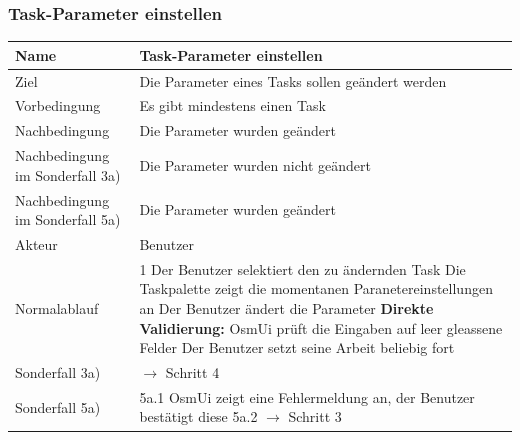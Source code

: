 \documentclass[a4paper,12pt]{scrartcl}
\begin{document}
\subsubsection{Task-Parameter einstellen}
\begin{center}
\begin{tabular}{|p{5cm}|p{10cm}|}
\hline Name & \textbf{Task-Parameter einstellen} \\ 
\hline Ziel & Die Parameter eines Tasks sollen geändert werden\\ 
\hline Vorbedingung & Es gibt mindestens einen Task\\ 
\hline Nachbedingung & Die Parameter wurden geändert\\  
\hline Nachbedingung im Sonderfall 3a) & Die Parameter wurden nicht geändert\\
\hline Nachbedingung im Sonderfall 5a) & Die Parameter wurden geändert\\
\hline Akteur & Benutzer \\ 
\hline Normalablauf & 1 Der Benutzer selektiert den zu ändernden Task
\newline 2 Die Taskpalette zeigt die momentanen Paranetereinstellungen an
\newline 3 Der Benutzer ändert die Parameter
\newline 4 \textbf{Direkte Validierung:} OsmUi prüft die Eingaben auf leer gleassene Felder
\newline 5 Der Benutzer setzt seine Arbeit beliebig fort\\ 
\hline Sonderfall 3a) & $ \rightarrow$ Schritt 4\\
\hline Sonderfall 5a) & 5a.1 OsmUi zeigt eine Fehlermeldung an, der Benutzer bestätigt diese
\newline 5a.2 $ \rightarrow$ Schritt 3\\
\hline 
\end{tabular} 
\end{center}
\end{document}
